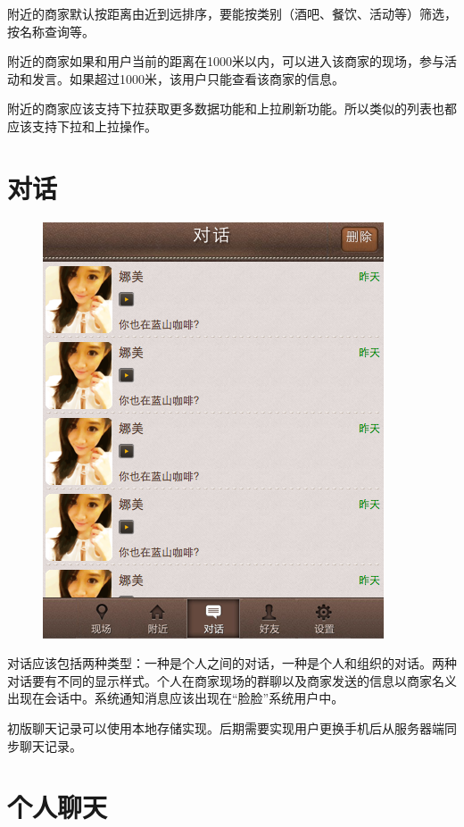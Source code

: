 \documentclass[cs4size]{ctexartutf8}
\begin{document}
附近的商家默认按距离由近到远排序，要能按类别（酒吧、餐饮、活动等）筛选，按名称查询等。

附近的商家如果和用户当前的距离在1000米以内，可以进入该商家的现场，参与活动和发言。如果超过1000米，该用户只能查看该商家的信息。

附近的商家应该支持下拉获取更多数据功能和上拉刷新功能。所以类似的列表也都应该支持下拉和上拉操作。


\section{对话}

\begin{figure}[H]
\centering
\includegraphics[scale=0.5]{./6.png}
\end{figure}

对话应该包括两种类型：一种是个人之间的对话，一种是个人和组织的对话。两种对话要有不同的显示样式。个人在商家现场的群聊以及商家发送的信息以商家名义出现在会话中。系统通知消息应该出现在“脸脸”系统用户中。

初版聊天记录可以使用本地存储实现。后期需要实现用户更换手机后从服务器端同步聊天记录。


\section{个人聊天}
\end{document}
